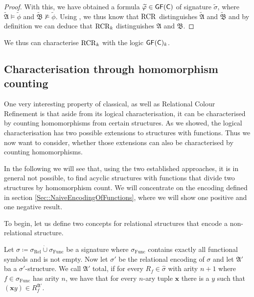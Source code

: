 \begin{proof}
	With this, we have obtained a formula $\widetilde{\varphi}\in\mathsf{GF}(\mathsf{C})$ of signature $\widetilde{\sigma}$, where $\widetilde{\mathfrak A}\models \widetilde{\phi}$ and $\widetilde{\mathfrak B}\not\models \widetilde{\phi}$.
	Using \cite{scheidt2025ColorRefinement}, we thus know that $\operatorname{RCR}$ distinguishes $\widetilde{\mathfrak A}$ and $\widetilde{\mathfrak B}$ and by definition we can deduce that $\operatorname{RCR}_k$ distinguishes $\mathfrak A$ and $\mathfrak B$.
\end{proof}

We thus can characterise $\operatorname{RCR}_k$ with the logic $\mathsf{GF}(\mathsf{C})_k$.

\subsection{Characterisation through homomorphism counting}

One very interesting property of classical, as well as Relational Colour Refinement is that aside from its logical characterisation, it can be characterised by counting homomorphisms from certain structures.
As we showed, the logical characterisation has two possible extensions to structures with functions.
Thus we now want to consider, whether those extensions can also be characterised by counting homomorphisms.

In the following we will see that, using the two established approaches, it is in general not possible, to find acyclic structures with functions that divide two structures by homomorphism count.
We will concentrate on the encoding defined in section \ref{Sec::NaiveEncodingOfFunctions}, where we will show one positive and one negative result.

To begin, let us define two concepts for relational structures that encode a non-relational structure.

\begin{definition}
	\label{def:TotalStructures}
	Let $\sigma\coloneqq \sigma_{\operatorname{Rel}} \operatorname{\dot{\cup}} \sigma_{\operatorname{Func}}$ be a signature where $\sigma_{\operatorname{Func}}$ contains exactly all functional symbols and is not empty.
	Now let $\sigma'$ be the relational encoding of $\sigma$ and let $\mathfrak A'$ ba a $\sigma'$-structure.
	We call $\mathfrak A'$ total, if for every $R_{f}\in\widehat{\sigma}$ with arity $n+1$ where $f\in \sigma_{\operatorname{Func}}$ has arity $n$, we have that for every $n$-ary tuple $\mathbf x$ there is a $y$ such that $(\mathbf xy)\in R^{\mathfrak A'}_{f}$.
\end{definition}

